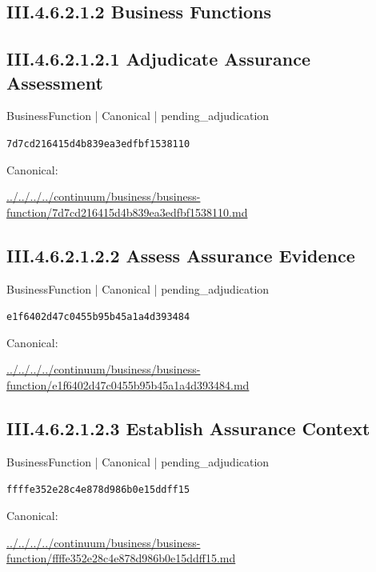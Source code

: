 \documentclass[10pt,a4paper]{article}
\begin{document}
\subsection*{III.4.6.2.1.2 Business Functions}
\subsection*{III.4.6.2.1.2.1 Adjudicate Assurance Assessment}
\label{element-7d7cd216415d4b839ea3edfbf1538110}
{\small BusinessFunction | Canonical | pending\_adjudication}\par
\texttt{7d7cd216415d4b839ea3edfbf1538110}\par
Canonical: \par
{\footnotesize\url{../../../../continuum/business/business-function/7d7cd216415d4b839ea3edfbf1538110.md}}\par
\subsection*{III.4.6.2.1.2.2 Assess Assurance Evidence}
\label{element-e1f6402d47c0455b95b45a1a4d393484}
{\small BusinessFunction | Canonical | pending\_adjudication}\par
\texttt{e1f6402d47c0455b95b45a1a4d393484}\par
Canonical: \par
{\footnotesize\url{../../../../continuum/business/business-function/e1f6402d47c0455b95b45a1a4d393484.md}}\par
\subsection*{III.4.6.2.1.2.3 Establish Assurance Context}
\label{element-ffffe352e28c4e878d986b0e15ddff15}
{\small BusinessFunction | Canonical | pending\_adjudication}\par
\texttt{ffffe352e28c4e878d986b0e15ddff15}\par
Canonical: \par
{\footnotesize\url{../../../../continuum/business/business-function/ffffe352e28c4e878d986b0e15ddff15.md}}\par
\end{document}
